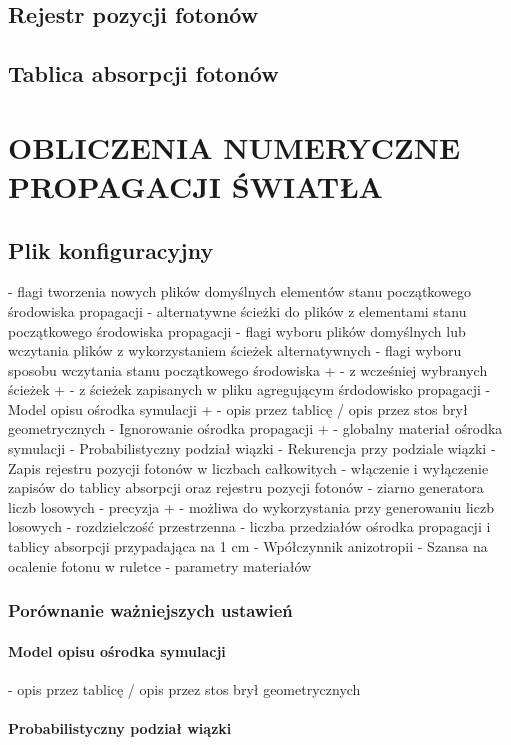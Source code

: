 \section{Rejestr pozycji fotonów}
\section{Tablica absorpcji fotonów}



\chapter{OBLICZENIA NUMERYCZNE PROPAGACJI ŚWIATŁA}
\label{chpt:obliczenia-numeryczne-propagacji-światła}
\section{Plik konfiguracyjny}
- flagi tworzenia nowych plików domyślnych elementów stanu początkowego środowiska propagacji
- alternatywne ścieżki do plików z elementami stanu początkowego środowiska propagacji
- flagi wyboru plików domyślnych lub wczytania plików z wykorzystaniem ścieżek alternatywnych
- flagi wyboru sposobu wczytania stanu początkowego środowiska
+    - z wcześniej wybranych ścieżek
+    - z ścieżek zapisanych w pliku agregującym śrdodowisko propagacji
- Model opisu ośrodka symulacji
+    - opis przez tablicę / opis przez stos brył geometrycznych
- Ignorowanie ośrodka propagacji
+    - globalny materiał ośrodka symulacji
- Probabilistyczny podział wiązki
- Rekurencja przy podziale wiązki
- Zapis rejestru pozycji fotonów w liczbach całkowitych
- włączenie i wyłączenie zapisów do tablicy absorpcji oraz rejestru pozycji fotonów
- ziarno generatora liczb losowych
- precyzja
+    - możliwa do wykorzystania przy generowaniu liczb losowych
- rozdzielczość przestrzenna - liczba przedziałów ośrodka propagacji i tablicy absorpcji przypadająca na 1 cm
- Wpółczynnik anizotropii
- Szansa na ocalenie fotonu w ruletce
- parametry materiałów

\subsection{Porównanie ważniejszych ustawień}
\subsubsection{Model opisu ośrodka symulacji}
- opis przez tablicę / opis przez stos brył geometrycznych
\subsubsection{Probabilistyczny podział wiązki}
